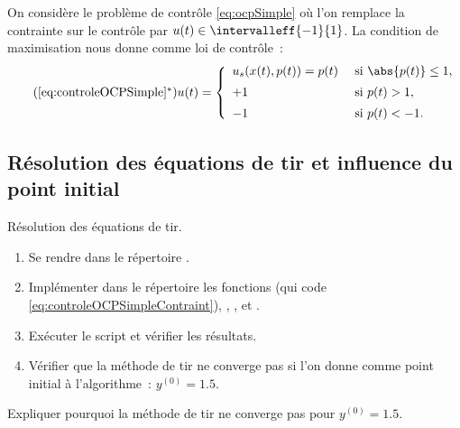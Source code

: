 On consid\`ere le probl\`eme de contr\^ole \eqref{eq:ocpSimple} o\`u l'on remplace la contrainte sur le contr\^ole par
$u(t) \in \intervalleff{-1}{1}$. La condition de maximisation nous donne comme loi de contr\^ole~:
\begin{equation}
    \tag{\ref{eq:controleOCPSimple}$^*$}
    u(t) = 
    \left\{
        \begin{array}{ll}
            u_s(x(t),p(t)) = p(t)   & \text{ si } \abs{p(t)} \le 1, \\[0.5em]
            +1                      & \text{ si } p(t) > 1, \\[0.5em]
            -1                      & \text{ si } p(t) < -1.
        \end{array}
    \right.
    \label{eq:controleOCPSimpleContraint}
\end{equation}

\subsection{R\'esolution des \'equations de tir et influence du point initial}

\begin{myExercice} R\'esolution des \'equations de tir.
    \begin{enumerate}
        \item Se rendre dans le r\'epertoire .
        \item Impl\'ementer dans le r\'epertoire  les fonctions  (qui code \eqref{eq:controleOCPSimpleContraint}),
            , ,  et .
        \item Ex\'ecuter le script  et v\'erifier les r\'esultats.
        \item V\'erifier que la m\'ethode de tir ne converge pas si l'on donne comme point initial \`a l'algorithme~: $y^{(0)} = 1.5$.
    \end{enumerate}
\end{myExercice}

\begin{myQuestion}
    \label{question:tir_simple}
    Expliquer pourquoi la m\'ethode de tir ne converge pas pour $y^{(0)} = 1.5$.
\end{myQuestion}

